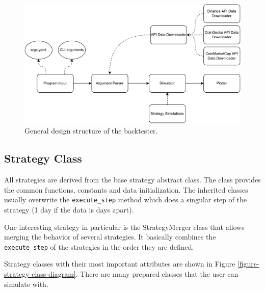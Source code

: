 \begin{figure}[!hbt]
    \centering
    \includegraphics[width=\columnwidth]{figures/structure-diagram.pdf}
    \caption{General design structure of the backtester.}
    \label{structure-diagram}
\end{figure}

\subsection*{Strategy Class}
All strategies are derived from the base strategy abstract class. The class provides the common functions, constants and data initialization. The inherited classes usually overwrite the \texttt{execute\_step} method which does a singular step of the strategy (1 day if the data is days apart).

One interesting strategy in particular is the StrategyMerger class that allows merging the behavior of several strategies. It basically combines the \texttt{execute\_step} of the strategies in the order they are defined.

Strategy classes with their most important attributes are shown in Figure \ref{figure-strategy-class-diagram}. There are many prepared classes that the user can simulate with.

